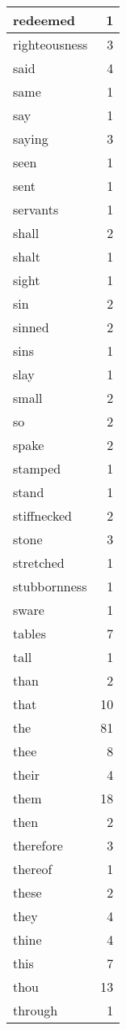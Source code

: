 \begin{center}
\begin{longtable}{l|r}
redeemed & 1 \\ \hline
righteousness & 3 \\ \hline
said & 4 \\ \hline
same & 1 \\ \hline
say & 1 \\ \hline
saying & 3 \\ \hline
seen & 1 \\ \hline
sent & 1 \\ \hline
servants & 1 \\ \hline
shall & 2 \\ \hline
shalt & 1 \\ \hline
sight & 1 \\ \hline
sin & 2 \\ \hline
sinned & 2 \\ \hline
sins & 1 \\ \hline
slay & 1 \\ \hline
small & 2 \\ \hline
so & 2 \\ \hline
spake & 2 \\ \hline
stamped & 1 \\ \hline
stand & 1 \\ \hline
stiffnecked & 2 \\ \hline
stone & 3 \\ \hline
stretched & 1 \\ \hline
stubbornness & 1 \\ \hline
sware & 1 \\ \hline
tables & 7 \\ \hline
tall & 1 \\ \hline
than & 2 \\ \hline
that & 10 \\ \hline
the & 81 \\ \hline
thee & 8 \\ \hline
their & 4 \\ \hline
them & 18 \\ \hline
then & 2 \\ \hline
therefore & 3 \\ \hline
thereof & 1 \\ \hline
these & 2 \\ \hline
they & 4 \\ \hline
thine & 4 \\ \hline
this & 7 \\ \hline
thou & 13 \\ \hline
through & 1 \\ \hline

\end{longtable}
\end{center}
